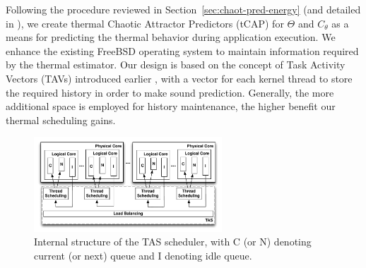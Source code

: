 \documentclass[times, 10pt,twocolumn]{IEEEtran}
\begin{document}
Following the procedure reviewed in Section~\ref{sec:chaot-pred-energy}
(and detailed in \cite{Lewis2010}), we create thermal Chaotic Attractor
Predictors (tCAP) for $\Theta$ and $C_{\theta}$ as a means for
predicting the thermal behavior during application execution.  We
enhance the existing FreeBSD operating system to maintain information
required by the thermal estimator.  Our design is based on the
concept of Task Activity Vectors (TAVs) introduced earlier
\cite{Merkel2008a}, with a vector for each kernel thread to store the
required history in order to make sound prediction.  Generally, the more
additional space is employed for history maintenance, the higher benefit
our thermal scheduling gains.

\begin{figure}[b]
  \centering
  \includegraphics[width=1.0\linewidth,height=1.4in]{architecture}
  \caption{Internal structure of the TAS scheduler, with C (or N) denoting current (or next) queue and I denoting idle queue.}
  \label{fig:tasque}
\end{figure}
\end{document}
